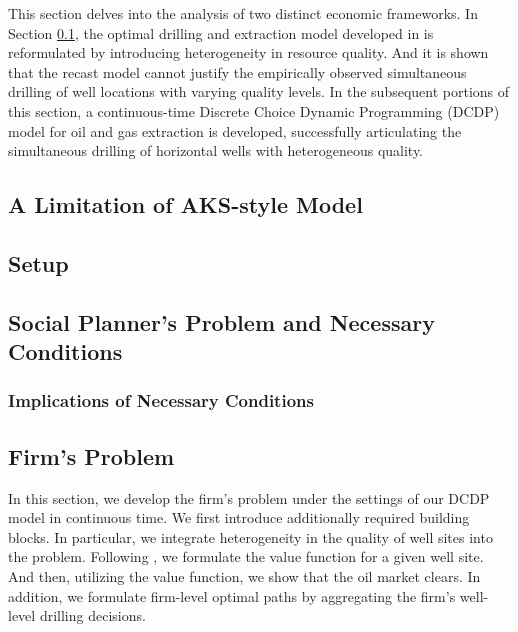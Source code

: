 This section delves into the analysis of two distinct economic frameworks. In Section \ref{C3-SubSection:A-Limitation-of-AKS-style-Model}, the optimal drilling and extraction model developed in \cite{Hotelling-under-Pressure_AKS_2018} is reformulated by introducing heterogeneity in resource quality. And it is shown that the recast model cannot justify the empirically observed simultaneous drilling of well locations with varying quality levels. In the subsequent portions of this section, a continuous-time Discrete Choice Dynamic Programming (DCDP) model for oil and gas extraction is developed, successfully articulating the simultaneous drilling of horizontal wells with heterogeneous quality.

\subsection{A Limitation of AKS-style Model}
\label{C3-SubSection:A-Limitation-of-AKS-style-Model}


\subsection{Setup}
\label{C3-SubSection:Setup}


\subsection{Social Planner's Problem and Necessary Conditions}
\label{C3-SubSection:Social-Planners-Problem-and-Necessary-Conditions}


\subsubsection{Implications of Necessary Conditions}
\label{C3-SubSubSection:Necessary-Conditions}


\subsection{Firm's Problem}
\label{C3-SubSection:Firms-Problem}
In this section, we develop the firm's problem under the settings of our DCDP model in continuous time. We first introduce additionally required building blocks. In particular, we integrate heterogeneity in the quality of well sites into the problem. Following \cite{Estimation-of-Dynamic-Discrete-Choice-Models-in-Continuous-Time_ABBE_2016}, we formulate the value function for a given well site. And then, utilizing the value function, we show that the oil market clears. In addition, we formulate firm-level optimal paths by aggregating the firm's well-level drilling decisions. 

